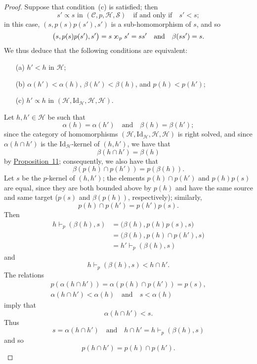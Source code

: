 \documentclass[a4paper,oneside,nobib,nofonts,notitlepage,notoc,nols,fleqn,justified]{tufte-book}
\newcommand{\CC}{\mathcal{C}}
\newcommand{\HH}{\mathcal{H}}
\renewcommand{\SS}{\mathcal{S}}
\newcommand{\subs}{\mathrel{\propto}}
\newcommand{\sups}{\mathrel{\reflectbox{$\propto$}}}
\newcommand{\Id}{\mathrm{Id}}
\begin{document}
\begin{proof}
  Suppose that condition~(c) is satisfied;
  then
  \[
    s'\subs s\text{ in }(\CC,p,\HH,\SS)
    \quad\text{if and only if}\quad
    s'<s;
  \]
  in this case, $(s,p(s)p(s'),s')$ is a sub-homomorphism of $s$, and so
  \[
    \big(
      s, p(s)p(s'), s'
    \big)
    = s\sups_p s'
    = ss'
    \quad\text{and}\quad
    \beta(ss')=s.
  \]
  We thus deduce that the following conditions are equivalent:
  \begin{enumerate}
    \item[\normalfont(a)]
      $h'<h$ in $\HH$;
    \item[\normalfont(b)]
      $\alpha(h')<\alpha(h)$, $\beta(h')<\beta(h)$, and $p(h)<p(h')$;
    \item[\normalfont(c)]
      $h'\subs h$ in $(\HH,\Id_\HH,\HH,\HH)$.
  \end{enumerate}
  Let $h,h'\in\HH$ be such that
  \[
    \alpha(h) = \alpha(h')
    \quad\text{and}\quad
    \beta(h) = \beta(h');
  \]
  since the category of homomorphisms $(\HH,\Id_\HH,\HH,\HH)$ is right solved, and since $\alpha(h\cap h')$ is the $\Id_\HH$-kernel of $(h,h')$, we have that
  \[
    \beta(h\cap h')
    = \beta(h)
  \]
  by \hyperref[proposition:i-11]{Proposition~11};
  consequently, we also have that
  \[
    \beta(p(h)\cap p(h'))
    = p(\beta(h)).
  \]
  Let $s$ be the $p$-kernel of $(h,h')$;
  the elements $p(h)\cap p(h')$ and $p(h)p(s)$ are equal, since they are both bounded above by $p(h)$ and have the same source and same target ($p(s)$ and $\beta(p(h))$, respectively);
  similarly,
  \[
    p(h)\cap p(h')
    = p(h')p(s).
  \]
  Then
  \[
    \begin{aligned}
      h\vdash_p(\beta(h),s)
      &= \big(
        \beta(h), p(h)p(s), s
      \big)
    \\&= \big(
        \beta(h), p(h)\cap p(h'), s
      \big)
    \\&= h'\vdash_p(\beta(h),s)
    \end{aligned}
  \]
  and
  \[
    h\vdash_p(\beta(h),s)
    < h\cap h'.
  \]
  The relations
  \[
    \begin{gathered}
      p(\alpha(h\cap h'))
      = \alpha(p(h)\cap p(h'))
      = p(s),
    \\\alpha(h\cap h') < \alpha(h)
      \quad\text{and}\quad
      s < \alpha(h)
    \end{gathered}
  \]
  imply that
  \[
    \alpha(h\cap h')
    < s.
  \]
  Thus
  \[
    s = \alpha(h\cap h')
    \quad\text{and}\quad
    h\cap h' = h\vdash_p(\beta(h),s)
  \]
  and so
  \[
    p(h\cap h')
    = p(h)\cap p(h').
  \]


\end{proof}
\end{document}
